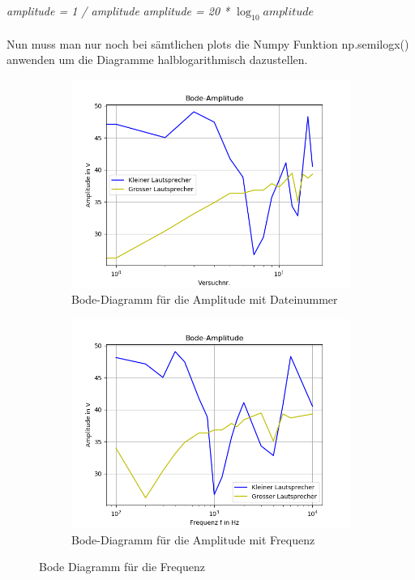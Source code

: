 \documentclass[12pt, oneside, a4paper, \docLanguage]{report}
\begin{document}
\\~\\
\textit{amplitude = 1 / amplitude} 
\newline
\textit{amplitude = 20 * $\log_{10} amplitude$} 
\\~\\
Nun muss man nur noch bei sämtlichen plots die Numpy Funktion np.semilogx() anwenden um die Diagramme halblogarithmisch dazustellen.
\begin{figure}[H]
\centering
\begin{subfigure}{.5\textwidth}
  \centering
  \includegraphics[width=0.9\linewidth]{../data/img/bodeamplitudeanzahl.png}
  \caption{Bode-Diagramm für die Amplitude mit Dateinummer}
  \label{fig:Bode-Diagramm für die Amplitude mit Dateinummer}
\end{subfigure}%
\begin{subfigure}{.5\textwidth}
  \centering
  \includegraphics[width=0.9\linewidth]{../data/img/bodeamplitudefrequenz.png}
  \caption{Bode-Diagramm für die Amplitude mit Frequenz}
  \label{fig:Bode-Diagramm für die Amplitude mit Frequenz}
\end{subfigure}
\caption{Bode Diagramm für die Frequenz}
\label{fig:Bode Diagramm für die Frequenz}
\end{figure}
\end{document}
